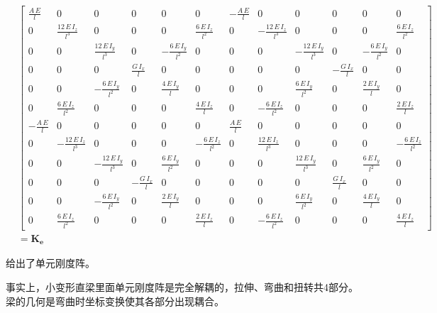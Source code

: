\documentclass[UTF8,c5size]{ctexart}
\begin{document}
\begin{equation}
    \begin{split}
        &\left[\begin{array}{cccccccccccc} \frac{A\,E}{l} & 0 & 0 & 0 & 0 & 0 & -\frac{A\,E}{l} & 0 & 0 & 0 & 0 & 0\\ 0 & \frac{12\,E\,I_{z}}{l^3} & 0 & 0 & 0 & \frac{6\,E\,I_{z}}{l^2} & 0 & -\frac{12\,E\,I_{z}}{l^3} & 0 & 0 & 0 & \frac{6\,E\,I_{z}}{l^2}\\ 0 & 0 & \frac{12\,E\,I_{y}}{l^3} & 0 & -\frac{6\,E\,I_{y}}{l^2} & 0 & 0 & 0 & -\frac{12\,E\,I_{y}}{l^3} & 0 & -\frac{6\,E\,I_{y}}{l^2} & 0\\ 0 & 0 & 0 & \frac{G\,I_{x}}{l} & 0 & 0 & 0 & 0 & 0 & -\frac{G\,I_{x}}{l} & 0 & 0\\ 0 & 0 & -\frac{6\,E\,I_{y}}{l^2} & 0 & \frac{4\,E\,I_{y}}{l} & 0 & 0 & 0 & \frac{6\,E\,I_{y}}{l^2} & 0 & \frac{2\,E\,I_{y}}{l} & 0\\ 0 & \frac{6\,E\,I_{z}}{l^2} & 0 & 0 & 0 & \frac{4\,E\,I_{z}}{l} & 0 & -\frac{6\,E\,I_{z}}{l^2} & 0 & 0 & 0 & \frac{2\,E\,I_{z}}{l}\\ -\frac{A\,E}{l} & 0 & 0 & 0 & 0 & 0 & \frac{A\,E}{l} & 0 & 0 & 0 & 0 & 0\\ 0 & -\frac{12\,E\,I_{z}}{l^3} & 0 & 0 & 0 & -\frac{6\,E\,I_{z}}{l^2} & 0 & \frac{12\,E\,I_{z}}{l^3} & 0 & 0 & 0 & -\frac{6\,E\,I_{z}}{l^2}\\ 0 & 0 & -\frac{12\,E\,I_{y}}{l^3} & 0 & \frac{6\,E\,I_{y}}{l^2} & 0 & 0 & 0 & \frac{12\,E\,I_{y}}{l^3} & 0 & \frac{6\,E\,I_{y}}{l^2} & 0\\ 0 & 0 & 0 & -\frac{G\,I_{x}}{l} & 0 & 0 & 0 & 0 & 0 & \frac{G\,I_{x}}{l} & 0 & 0\\ 0 & 0 & -\frac{6\,E\,I_{y}}{l^2} & 0 & \frac{2\,E\,I_{y}}{l} & 0 & 0 & 0 & \frac{6\,E\,I_{y}}{l^2} & 0 & \frac{4\,E\,I_{y}}{l} & 0\\ 0 & \frac{6\,E\,I_{z}}{l^2} & 0 & 0 & 0 & \frac{2\,E\,I_{z}}{l} & 0 & -\frac{6\,E\,I_{z}}{l^2} & 0 & 0 & 0 & \frac{4\,E\,I_{z}}{l} \end{array}\right]
        \\
        &=\bm{K_e}
    \end{split}
\end{equation}

给出了单元刚度阵。

事实上，小变形直梁里面单元刚度阵是完全解耦的，拉伸、弯曲和扭转共4部分。
梁的几何是弯曲时坐标变换使其各部分出现耦合。
    
\end{document}
